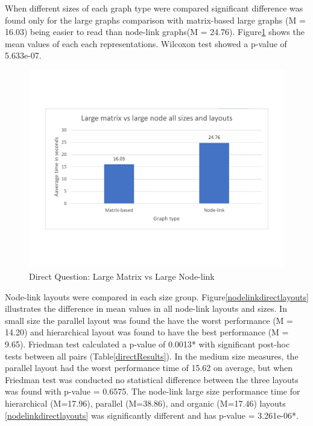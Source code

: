 \documentclass{l4proj}
\begin{document}
When different sizes of each graph type were compared significant difference was found only for the large graphs comparison with matrix-based large graphs (M = 16.03) being easier to read than node-link graphs(M = 24.76). Figure\ref{largenodevsmartrixdirect} shows the mean values of each each representations. Wilcoxon test showed a p-value of 5.633e-07. 

\begin{figure}[H]
\centering
\includegraphics[width=15cm]{largenodevsmartrixdirect.pdf}
\caption{Direct Question: Large Matrix vs Large Node-link}
\label{largenodevsmartrixdirect}
\end{figure}

Node-link layouts were compared in each size group. Figure\ref{nodelinkdirectlayouts} illustrates the difference in mean values in all node-link layouts and sizes. In small size the parallel layout was found the have the worst performance (M = 14.20) and hierarchical layout was found to have the best performance (M = 9.65). Friedman test calculated a p-value of 0.0013* with significant post-hoc tests between all pairs (Table\ref{directResults}). In the medium size measures, the parallel layout had the worst performance time of 15.62 on average, but when Friedman test was conducted no statistical difference between the three layouts was found with p-value = 0.6575. The node-link large size performance time for hierarchical (M=17.96), parallel (M=38.86), and organic (M=17.46) layouts \ref{nodelinkdirectlayouts} was significantly different and has p-value = 3.261e-06*. 
\end{document}
